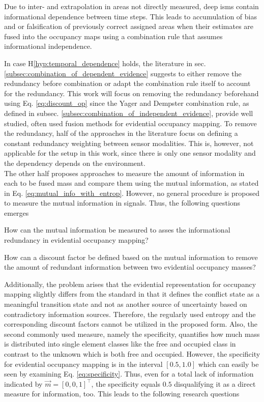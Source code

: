 \begin{hyp} \label{hyp:temporal_dependence}
	Due to inter- and extrapolation in areas not directly measured, deep \gls{ism}s contain informational dependence between time steps. This leads to accumulation of bias and or falsification of previously correct assigned areas when their estimates are fused into the occupancy maps using a combination rule that assumes informational independence.  
\end{hyp} 
In case H\ref{hyp:temporal_dependence} holds, the literature in sec. \ref{subsec:combination_of_dependent_evidence} suggests to either remove the redundancy before combination or adapt the combination rule itself to account for the redundancy. This work will focus on removing the redundancy beforehand using Eq. \ref{eq:discount_op} since the Yager and Dempster combination rule, as defined in subsec. \ref{subsec:combination_of_independent_evidence}, provide well studied, often used fusion methods for evidential occupancy mapping. To remove the redundancy, half of the approaches in the literature focus on defining a constant redundancy weighting between sensor modalities. This is, however, not applicable for the setup in this work, since there is only one sensor modality and the dependency depends on the environment.\\
The other half proposes approaches to measure the amount of information in each to be fused mass and compare them using the mutual information, as stated in Eq. \ref{eq:mutual_info_with_entrop}. However, no general procedure is proposed to measure the mutual information in signals. Thus, the following questions emerges
\begin{requ} \label{requ:how_to_meas_redund}
	How can the mutual information be measured to asses the informational redundancy in evidential occupancy mapping?
\end{requ}
\begin{requ} \label{requ:how_to_define_discount_fact}
	How can a discount factor be defined based on the mutual information to remove the amount of redundant information between two evidential occupancy masses?
\end{requ}
Additionally, the problem arises that the evidential representation for occupancy mapping slightly differs from the standard in that it defines the conflict state as a meaningful transition state and not as another source of uncertainty based on contradictory information sources. Therefore, the regularly used entropy and the corresponding discount factors cannot be utilized in the proposed form. Also, the second commonly used measure, namely the specificity, quantifies how much mass is distributed into single element classes like the free and occupied class in contrast to the unknown which is both free and occupied. However, the specificity for evidential occupancy mapping is in the interval $[0.5,1.0]$ which can easily be seen by examining Eq. \ref{eq:specificity}. Thus, even for a total lack of information indicated by $\vec{m} = [0,0,1]^\top$, the specificity equals $0.5$ disqualifying it as a direct measure for information, too. This leads to the following research questions 
